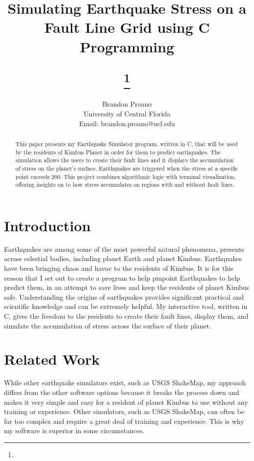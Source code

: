 \documentclass[conference]{IEEEtran}
\begin{document}
\title{Simulating Earthquake Stress on a Fault Line Grid using C Programming\\

\author{Brandon Proano \\ University of Central Florida \\ Email: brandon.proano@ucf.edu}

{\footnotesize \textsuperscript{}}
\thanks{}
}



\maketitle

\begin{abstract}
This paper presents my Earthquake Simulator program, written in C, that will be used by the residents of Kimbus Planet in order for them to predict earthquakes. The simulation allows the users to create their fault
lines and it displays the accumulation of stress on the planet's surface. Earthquakes are triggered when the stress at a specific point exceeds 200. This project combines algorithmic logic with terminal visualization, offering insights on to how stress accumulates on regions with and without fault lines. 
\end{abstract}


\section{Introduction}
Earthquakes are among some of the most powerful natural phenomena, presents across celestial bodies, including planet Earth and planet Kimbus.
Earthquakes have been bringing chaos and havoc to the residents of Kimbus. It is for this reason that I set out to create a program to help pinpoint Earthquakes to help predict them, in an attempt to save lives and keep the residents of planet Kimbus safe. Understanding the origins of earthquakes provides significant practical and scientific knowledge and can be extremely helpful. My interactive tool, written in C, gives the freedom to the residents to create their fault lines, display them, and simulate the accumulation of stress across the surface of their planet. 


\section{Related Work}
While other earthquake simulators exist, such as USGS ShakeMap, my approach differs from the other software options because it breaks the process down and makes it very simple and easy for a resident of planet Kimbus to use without any training or experience. Other simulators, such as USGS ShakeMap, can often be far too complex and require a great deal of training and experience. This is why my software is superior in some circumstances. 
\end{document}
